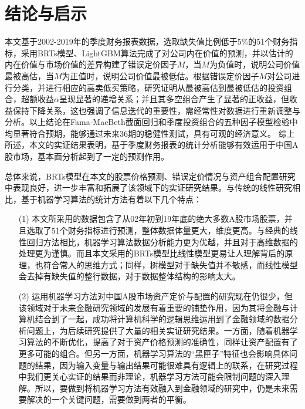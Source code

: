 
\chapter{结论与启示}
本文基于2002-2019年的季度财务报表数据，选取缺失值比例低于5\%的51个财务指标，采用BRTs模型、LightGBM算法完成了对公司内在价值的预测，并以估计的内在价值与市场价值的差异构建了错误定价因子$M$，当$M$为负值时，说明公司价值最被高估，当$M$为正值时，说明公司价值最被低估。根据错误定价因子$M$对公司进行分类，并进行相应的高卖低买策略，研究证明从最被高估到最被低估的投资组合，超额收益$\alpha$呈现显著的递增关系；并且其多空组合产生了显著的正收益，但收益保持下降关系，这也强调了信息迭代的重要性，需经常性对数据进行重新调整与分析。以上结论在Fama-MacBeth截面回归和季度投资组合的五种因子模型检验中均显著符合预期，能够通过未来36期的稳健性测试，具有可观的经济意义。
综上所述，本文的实证结果表明，基于季度财务报表的统计分析能够有效运用于中国A股市场，基本面分析起到了一定的预测作用。

总体来说，BRTs模型在本文的股票价格预测、错误定价情况与资产组合配置研究中表现良好，进一步丰富和拓展了该领域下的实证研究结果。与传统的线性研究相比，基于机器学习算法的统计方法有着以下几个特点：
\begin{itemize}
\item[(1)] 本文所采用的数据包含了从02年初到19年底的绝大多数A股市场股票，并且选取了51个财务指标进行预测，整体数据体量更大，维度更高。与经典的线性回归方法相比，机器学习算法数据分析能力更为优越，并且对于高维数据的处理更为谨慎。而且本文采用的BRTs模型比线性模型更易让人理解背后的原理，也符合常人的思维方式；同样，树模型对于缺失值并不敏感，而线性模型会去掉有缺失值的整行数据，对于数据整体结构的影响太大。
\item[(2)] 运用机器学习方法对中国A股市场资产定价与配置的研究现在仍很少，但该领域对于未来金融研究领域的发展有着重要的铺垫作用，因为其将金融与计算机结合到了一起，成功将计算机科学的逻辑思维运用到了金融领域的数据分析问题上，为后续研究提供了大量的相关实证研究结果\cite{zhaoJiQiXueXiZaiJinRongZiChanJieGeYuCeHePeiZhiZhongDeYingYongYanJiuShuPing2020}。一方面，随着机器学习算法的不断优化，提高了对于资产价格预测的准确性，同样让资产配置有了更多可能的组合。但另一方面，机器学习算法的“黑匣子”特征也会影响具体问题的结果，因为输入变量与输出结果可能很难具有逻辑上的联系，在研究过程中我们更关心实证的结果而非理论，机器学习方法可能会限制问题的深入理解。所以，要做到将机器学习方法有效融入到金融领域的研究中，仍是未来需要解决的一个关键问题，需要做到两者的平衡。
\end{itemize}

